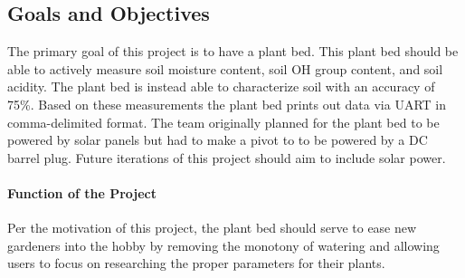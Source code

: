 \subsection{Goals and Objectives}
The primary goal of this project is to have a plant bed. This plant bed should be able to actively measure soil moisture content, soil OH group content, and soil acidity. 
The plant bed is instead able to characterize soil with an accuracy of 75\%.
Based on these measurements the plant bed prints out data via UART in comma-delimited format.
The team originally planned for the plant bed to be powered by solar panels but had to make a pivot to
to be powered by a DC barrel plug. Future iterations of this project should aim to include solar power.

\paragraph{Function of the Project} Per the motivation of this project, the plant bed should serve to ease new gardeners into the hobby by removing the monotony of watering and allowing users to focus on researching the proper parameters for their plants.